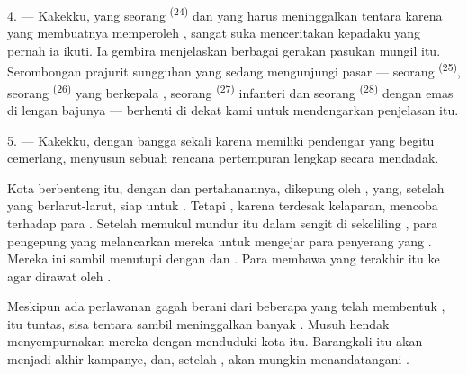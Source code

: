 \VUsaut{4.0mm}
\VUsaut{2.8mm}

4. --- Kakekku, yang seorang 
\textsuperscript{(24)} dan yang harus meninggalkan tentara karena
 yang membuatnya memperoleh ,
sangat suka menceritakan kepadaku  yang
pernah ia ikuti. Ia gembira menjelaskan berbagai gerakan pasukan
mungil itu. Serombongan prajurit sungguhan yang sedang mengunjungi
pasar --- seorang  \textsuperscript{(25)},
seorang  \textsuperscript{(26)} yang
berkepala , seorang 
\textsuperscript{(27)} infanteri dan seorang  \textsuperscript{(28)} dengan  emas di
lengan bajunya --- berhenti di dekat kami untuk mendengarkan
penjelasan itu.

5. --- Kakekku, dengan bangga sekali karena memiliki pendengar yang
begitu cemerlang, menyusun sebuah rencana pertempuran lengkap secara
mendadak.

Kota berbenteng itu, dengan  dan 
pertahanannya, dikepung oleh , yang, setelah
 yang berlarut-larut, siap untuk .
Tetapi , karena terdesak kelaparan,
mencoba  terhadap  para
. Setelah memukul mundur  itu
dalam  sengit di sekeliling ,
para pengepung yang  melancarkan 
mereka untuk mengejar para penyerang yang . Mereka ini
 sambil menutupi  dengan
 dan . Para  membawa yang terakhir itu ke  agar dirawat
oleh .

Meskipun ada perlawanan gagah berani dari beberapa 
yang telah membentuk ,  itu
tuntas, sisa tentara  sambil meninggalkan
banyak . Musuh hendak menyempurnakan
 mereka dengan menduduki kota itu. Barangkali itu
akan menjadi akhir kampanye, dan, setelah ,
akan mungkin menandatangani .

\VUsaut{4.4mm}
\VUsaut{2.8mm}

